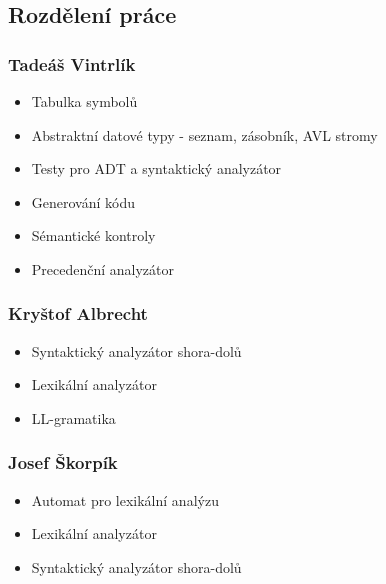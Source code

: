 \documentclass[a4paper]{article}
\theoremstyle{definition}
\begin{document}
\subsection{Rozdělení práce}



\subsubsection{Tadeáš Vintrlík}

\begin{itemize}
	\item Tabulka symbolů

	\item Abstraktní datové typy - seznam, zásobník, AVL stromy

	\item Testy pro ADT a syntaktický analyzátor
	
	\item Generování kódu

	\item Sémantické kontroly
	
	\item Precedenční analyzátor
\end{itemize}

\subsubsection{Kryštof Albrecht}

\begin{itemize}
	\item Syntaktický analyzátor shora-dolů

	\item Lexikální analyzátor
	
	\item LL-gramatika
\end{itemize}

\subsubsection{Josef Škorpík}

\begin{itemize}
	\item Automat pro lexikální analýzu

	\item Lexikální analyzátor
	
	\item Syntaktický analyzátor shora-dolů
\end{itemize}
\end{document}

